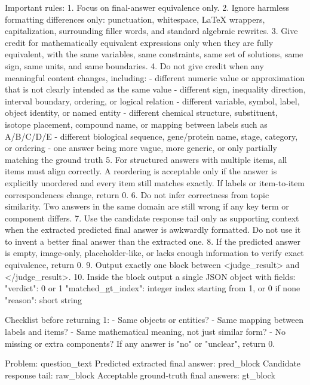 \documentclass[11pt]{article}
\begin{document}
\begin{tcolorbox}
\begin{tcblisting}
Important rules:
1. Focus on final-answer equivalence only.
2. Ignore harmless formatting differences only: punctuation, whitespace, LaTeX wrappers, capitalization, surrounding filler words, and standard algebraic rewrites.
3. Give credit for mathematically equivalent expressions only when they are fully equivalent, with the same variables, same constraints, same set of solutions, same sign, same units, and same boundaries.
4. Do not give credit when any meaningful content changes, including:
   - different numeric value or approximation that is not clearly intended as the same value
   - different sign, inequality direction, interval boundary, ordering, or logical relation
   - different variable, symbol, label, object identity, or named entity
   - different chemical structure, substituent, isotope placement, compound name, or mapping between labels such as A/B/C/D/E
   - different biological sequence, gene/protein name, stage, category, or ordering
   - one answer being more vague, more generic, or only partially matching the ground truth
5. For structured answers with multiple items, all items must align correctly. A reordering is acceptable only if the answer is explicitly unordered and every item still matches exactly. If labels or item-to-item correspondences change, return 0.
6. Do not infer correctness from topic similarity. Two answers in the same domain are still wrong if any key term or component differs.
7. Use the candidate response tail only as supporting context when the extracted predicted final answer is awkwardly formatted. Do not use it to invent a better final answer than the extracted one.
8. If the predicted answer is empty, image-only, placeholder-like, or lacks enough information to verify exact equivalence, return 0.
9. Output exactly one block between <judge_result> and </judge_result>.
10. Inside the block output a single JSON object with fields:
   "verdict": 0 or 1
   "matched_gt_index": integer index starting from 1, or 0 if none
   "reason": short string

Checklist before returning 1:
- Same objects or entities?
- Same mapping between labels and items?
- Same mathematical meaning, not just similar form?
- No missing or extra components?
If any answer is "no" or "unclear", return 0.

Problem: {question_text}
Predicted extracted final answer: {pred_block}
Candidate response tail: {raw_block}
Acceptable ground-truth final answers: {gt_block}
\end{tcblisting}
\end{tcolorbox}
\end{document}
